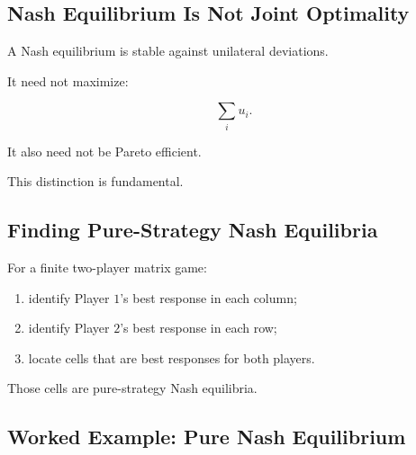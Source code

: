\subsection{Nash Equilibrium Is Not Joint Optimality}
\label{subsec:nash-not-joint-optimality}

A Nash equilibrium is stable against unilateral deviations.

It need not maximize:

\[
\boxed{
\sum_i
u_i.
}
\]

It also need not be Pareto efficient.

This distinction is fundamental.

\subsection{Finding Pure-Strategy Nash Equilibria}
\label{subsec:finding-pure-nash}

For a finite two-player matrix game:

\begin{enumerate}
    \item identify Player \(1\)'s best response in each column;
    \item identify Player \(2\)'s best response in each row;
    \item locate cells that are best responses for both players.
\end{enumerate}

Those cells are pure-strategy Nash equilibria.

\subsection{Worked Example: Pure Nash Equilibrium}
\label{subsec:worked-pure-nash}

